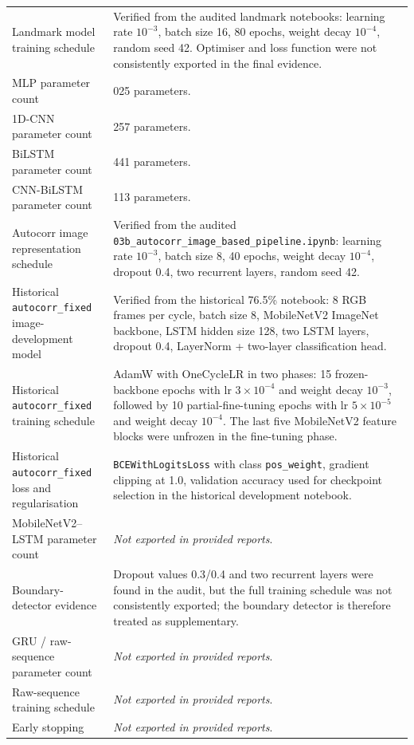 \begin{table}[htbp]
\begin{tabularx}{\textwidth}{
>{\raggedright\arraybackslash}p{}
>{\raggedright\arraybackslash}X}
\midrule
Landmark model training schedule & Verified from the audited landmark notebooks: learning rate $10^{-3}$, batch size 16, 80 epochs, weight decay $10^{-4}$, random seed 42. Optimiser and loss function were not consistently exported in the final evidence. \\
MLP parameter count & 193{,}025 parameters. \\
1D-CNN parameter count & 40{,}257 parameters. \\
BiLSTM parameter count & 173{,}441 parameters. \\
CNN-BiLSTM parameter count & 82{,}113 parameters. \\
\midrule
Autocorr image representation schedule & Verified from the audited \texttt{03b\_autocorr\_image\_based\_pipeline.ipynb}: learning rate $10^{-3}$, batch size 8, 40 epochs, weight decay $10^{-4}$, dropout 0.4, two recurrent layers, random seed 42. \\
Historical \texttt{autocorr\_fixed} image-development model & Verified from the historical 76.5\% notebook: 8 RGB frames per cycle, batch size 8, MobileNetV2 ImageNet backbone, LSTM hidden size 128, two LSTM layers, dropout 0.4, LayerNorm + two-layer classification head. \\
Historical \texttt{autocorr\_fixed} training schedule & AdamW with OneCycleLR in two phases: 15 frozen-backbone epochs with lr $3\times10^{-4}$ and weight decay $10^{-3}$, followed by 10 partial-fine-tuning epochs with lr $5\times10^{-5}$ and weight decay $10^{-4}$. The last five MobileNetV2 feature blocks were unfrozen in the fine-tuning phase. \\
Historical \texttt{autocorr\_fixed} loss and regularisation & \texttt{BCEWithLogitsLoss} with class \texttt{pos\_weight}, gradient clipping at 1.0, validation accuracy used for checkpoint selection in the historical development notebook. \\
MobileNetV2--LSTM parameter count & \textit{Not exported in provided reports}. \\
\midrule
Boundary-detector evidence & Dropout values 0.3/0.4 and two recurrent layers were found in the audit, but the full training schedule was not consistently exported; the boundary detector is therefore treated as supplementary. \\
GRU / raw-sequence parameter count & \textit{Not exported in provided reports}. \\
Raw-sequence training schedule & \textit{Not exported in provided reports}. \\
Early stopping & \textit{Not exported in provided reports}. \\
\bottomrule
\end{tabularx}


\end{table}
